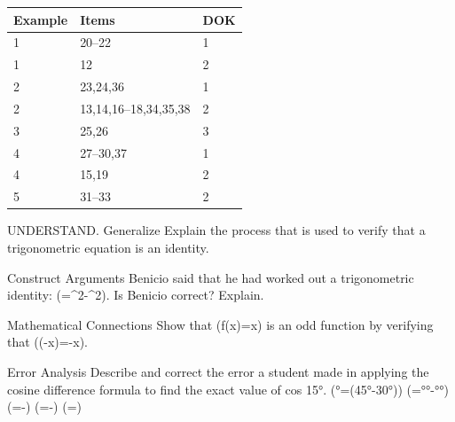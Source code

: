 \documentclass{article}
\newenvironment{item-analysis}{}{}      %
\newenvironment{practice}[2]{}{}        %
\newcommand{\answer}[1]{}               %
\newcommand{\placeholder}[2]{}          %
\begin{document}
\begin{item-analysis}
\begin{tabular}{lll}
\toprule
Example & Items & DOK \\
\midrule
1 & 20--22 & 1 \\
1 & 12 & 2 \\
2 & 23,24,36 & 1 \\
2 & 13,14,16--18,34,35,38 & 2 \\
3 & 25,26 & 3 \\
4 & 27--30,37 & 1 \\
4 & 15,19 & 2 \\
5 & 31--33 & 2 \\
\bottomrule
\end{tabular}
\end{item-analysis}
\begin{practice}{12}{2}
UNDERSTAND. Generalize Explain the process that is used to verify that a trigonometric equation is an identity.
\answer{Select one side of the equation and transform it until it is the same as the other side of the equation.}
\end{practice}
\begin{practice}{13}{2}
Construct Arguments Benicio said that he had worked out a trigonometric identity: (\theta=\cos^2\theta-\sin^2\theta). Is Benicio correct? Explain.
\answer{Yes; (\cos2\theta=\cos(\theta+\theta)=\cos\theta\cdot\cos\theta-\sin\theta\cdot\sin\theta=\cos^2\theta-\sin^2\theta).}
\end{practice}
\begin{practice}{14}{2}
Mathematical Connections Show that (f(x)=\tan x) is an odd function by verifying that (\tan(-x)=-\tan x).
\answer{(\tan(-x)=\frac{\sin(-x)}{\cos(-x)}=-\frac{\sin x}{\cos x}=-\tan x).}
\end{practice}
\begin{practice}{15}{2}
Error Analysis Describe and correct the error a student made in applying the cosine difference formula to find the exact value of cos 15°.
(°=\cos(45°-30°))
(=°°-°°)
(=\cdot{}-\cdot{})
(=-)
(=)
\placeholder{illustration}{Pale gray student work note with curled lower right corner and red X, containing the five incorrect calculation lines transcribed above.}
\answer{The student applied the cosine of sums formula rather than the cosine of differences. The correct answer is (\frac{\sqrt6+\sqrt2}{4}).}
\end{practice}
\end{document}
